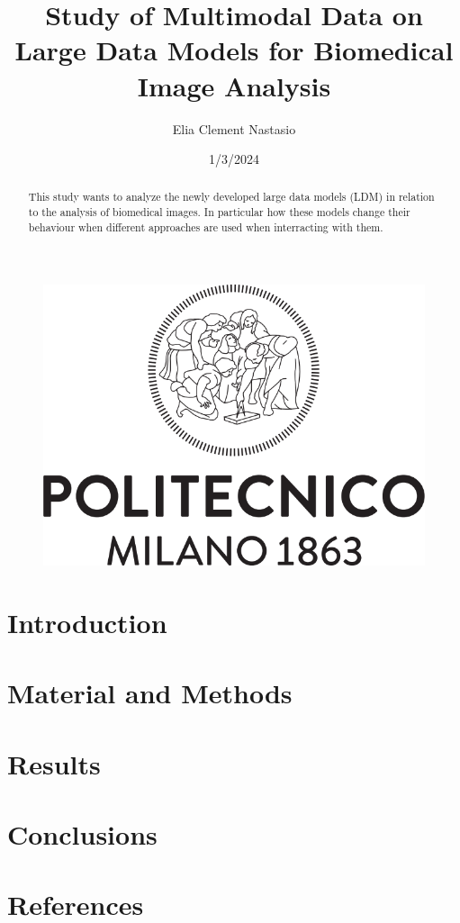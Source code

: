 \documentclass[a4paper,12pt]{article}
\title{Study of Multimodal Data on Large Data Models for Biomedical Image Analysis}
\begin{document}
\author{Elia Clement Nastasio}
\date{1/3/2024}
\begin{figure}
    \includegraphics[width=\linewidth]{Imm/polimi_logo.png}
  \end{figure}

\maketitle

\begin{abstract} 
This study wants to analyze the newly developed large data models (LDM) in relation to the analysis of 
biomedical images. In particular how these models change their behaviour when different approaches are 
used when interracting with them.
\end{abstract} 

\tableofcontents

\section{Introduction} 
\section{Material and Methods}
\section{Results}
\section{Conclusions}
\section{References}
\end{document}
